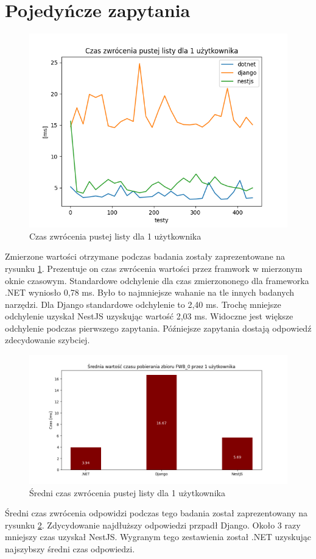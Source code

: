 \section{Pojedyńcze zapytania}

\begin{figure}[!hb]
	\centering \includegraphics[width=1\linewidth]{rysunki/Request_duration_for_1_user.png}
	\caption{Czas zwrócenia pustej listy dla 1 użytkownika}
	\label{rys:request_duration_for_1_user}
\end{figure}

Zmierzone wartości otrzymane podczas badania zostały zaprezentowane na rysunku \ref{rys:request_duration_for_1_user}.
Prezentuje on czas zwrócenia wartości przez framwork w mierzonym oknie czasowym.
Standardowe odchylenie dla czas zmierzononego dla frameworka .NET wyniosło 0,78 ms.
Było to najmniejsze wahanie na tle innych badanych narzędzi.
Dla Django standardowe odchylenie to 2,40 ms.
Trochę mniejsze odchylenie uzyskał NestJS uzyskując wartość 2,03 ms.
Widoczne jest większe odchylenie podczas pierwszego zapytania. Późniejsze zapytania dostają odpowiedź zdecydowanie szybciej.

\begin{figure}[!hb]
	\centering \includegraphics[width=1\linewidth]{rysunki/Mean_duration_for_1_user.png}
	\caption{Średni czas zwrócenia pustej listy dla 1 użytkownika}
	\label{rys:mean_duration_for_1_user}
\end{figure}

Średni czas zwrócenia odpowidzi podczas tego badania został zaprezentowany na rysunku \ref{rys:mean_duration_for_1_user}.
Zdycydowanie najdłuższy odpowiedzi przpadł Django.
Około 3 razy mniejszy czas uzyskał NestJS.
Wygranym tego zestawienia został .NET uzyskując najszybszy średni czas odpowiedzi.
